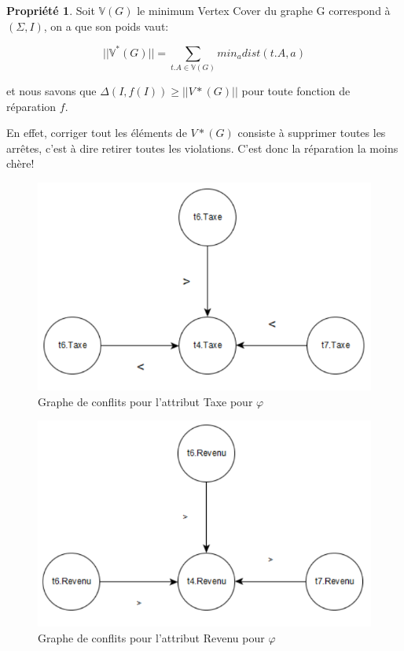 \documentclass[letterpaper, 12pt]{report}
\theoremstyle{definition}
\newtheorem{myprop}{Propriété}
\newcommand{\V}{\mathbb{V}}
\begin{document}
\begin{myprop}
\label{vertexCover}
Soit $\V (G)$ le minimum Vertex Cover du graphe G correspond à $(\Sigma,I)$, on a que son poids vaut:

$$ ||\V^*(G) || = \sum_{t.A \in \mathbb{V}(G)} min_{a} dist(t.A,a)$$

et nous savons que $\Delta(I,f(I)) \geq ||V*(G) ||$ pour toute fonction de réparation $f$. 
\end{myprop}

En effet, corriger tout les éléments de $V*(G)$ consiste à supprimer toutes les arrêtes, c'est à dire retirer toutes les violations. C'est donc la réparation la moins chère!

\begin{minipage}{.45\textwidth}\centering
\hspace*{-0.8cm}\begin{figure}[H]
 \includegraphics[scale=0.44]{img/ConflitTaxe.png}
 \caption{\label{grapht4Taxe} Graphe de conflits pour l'attribut Taxe pour $\varphi$}
\end{figure}\noindent
\end{minipage}
\begin{minipage}{.45\textwidth}\centering
\begin{figure}[H]
 \includegraphics[scale=0.44]{img/ConflitRevenu.png}
 \caption{\label{grapht4Revenu} Graphe de conflits pour l'attribut Revenu pour $\varphi$}
\end{figure}\noindent
\end{minipage}~\\
\end{document}
